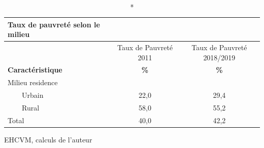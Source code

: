 \documentclass[
]{article}
\begin{document}
\setlength{\LTpost}{0mm}
\begin{longtable}{lcc}
\caption*{
{\large \textbf{Taux de pauvreté selon le milieu}}
} \\ 
\toprule
 & Taux de Pauvreté 2011 & Taux de Pauvreté 2018/2019 \\ 
\cmidrule(lr){2-2} \cmidrule(lr){3-3}
\textbf{Caractéristique} & \textbf{\%} & \textbf{\%} \\ 
\midrule\addlinespace[2.5pt]
Milieu residence &  &  \\ 
    Urbain & 22,0 & 29,4 \\ 
    Rural & 58,0 & 55,2 \\ 
Total & 40,0 & 42,2 \\ 
\bottomrule
\end{longtable}
\begin{minipage}{\linewidth}
EHCVM, calculs de l'auteur\\
\end{minipage}
\end{document}
